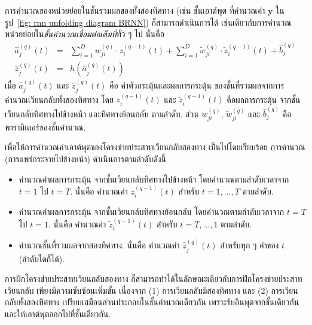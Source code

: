 การคำนวณของหน่วยย่อยในชั้นรวมผลของทั้งสองทิศทาง (เช่น ชั้นเอาต์พุต ที่คำนวณค่า $\bm{y}$ ในรูป~\ref{fig: rnn unfolding diagram BRNN})
ก็สามารถดำเนินการได้ เช่นเดียวกับการคำนวณหน่วยย่อยใน\textit{ชั้นคำนวณเชื่อมต่อเต็มที่}ทั่ว ๆ ไป
นั่นคือ
\begin{eqnarray}
\hat{a}_j^{(q)}(t) 
&=& 
\sum_{i=1}^D w_{ji}^{(q)} \cdot z_{i}^{(q-1)}(t)
+ \sum_{i=1}^{\tilde{D}} \tilde{w}_{ji}^{(q)} \cdot \tilde{z}_{i}^{(q-1)}(t)
+ \hat{b}_j^{(q)}
\label{eq: BRNN combine layer a} \\
\hat{z}_j^{(q)}(t) &=& h(\hat{a}_j^{(q)}(t))
\label{eq: BRNN combine layer z}
\end{eqnarray}
เมื่อ
$\hat{a}_j^{(q)}(t)$
และ
$\hat{z}_j^{(q)}(t)$
คือ
ค่าตัวกระตุ้นและผลการกระตุ้น ของชั้นที่รวมผลจากการคำนวณเวียนกลับทั้งสองทิศทาง
โดย
$z_{i}^{(q-1)}(t)$
และ
$\tilde{z}_{i}^{(q-1)}(t)$
คือผลการกระตุ้น
จากชั้นเวียนกลับทิศทางไปข้างหน้า และทิศทางย้อนกลับ ตามลำดับ.
ส่วน $w_{ji}^{(q)}$, 
$\tilde{w}_{ji}^{(q)}$
และ $\hat{b}_j^{(q)}$
คือพารามิเตอร์ของชั้นคำนวณ.

เพื่อให้การคำนวณค่าเอาต์พุตของโครงข่ายประสาทเวียนกลับสองทาง
เป็นไปโดยเรียบร้อย
การคำนวณ (การแพร่กระจายไปข้างหน้า) ดำเนินการตามลำดับดังนี้
%
\begin{itemize}
	\item คำนวณค่าผลการกระตุ้น จากชั้นเวียนกลับทิศทางไปข้างหน้า 
	โดยคำนวณตามลำดับเวลาจาก $t = 1$ ไป $t = T$.
	นั่นคือ คำนวณค่า $z_{i}^{(q-1)}(t)$ สำหรับ $t = 1, \ldots, T$ ตามลำดับ.
	\item คำนวณค่าผลการกระตุ้น จากชั้นเวียนกลับทิศทางย้อนกลับ 
	โดยคำนวณตามลำดับเวลาจาก $t = T$ ไป $t = 1$.
	นั่นคือ คำนวณค่า $\tilde{z}_{i}^{(q-1)}(t)$ สำหรับ $t = T, \ldots, 1$ ตามลำดับ.
	\item คำนวณชั้นที่รวมผลจากสองทิศทาง.
	นั่นคือ คำนวณค่า $\hat{z}_j^{(q)}(t)$ สำหรับทุก ๆ ค่าของ $t$ (ลำดับใดก็ได้).
\end{itemize}

การฝึกโครงข่ายประสาทเวียนกลับสองทาง
ก็สามารถทำได้ในลักษณะเดียวกับการฝึกโครงข่ายประสาทเวียนกลับ
เพียงมีความซับซ้อนเพิ่มขั้น
เนื่องจาก
(1) การเวียนกลับมีสองทิศทาง
และ (2) การเวียนกลับทั้งสองทิศทาง เปรียบเสมือนส่วนประกอบในชั้นคำนวณเดียวกัน
เพราะรับอินพุตจากชั้นเดียวกัน และให้เอาต์พุตออกไปที่ชั้นเดียวกัน.

